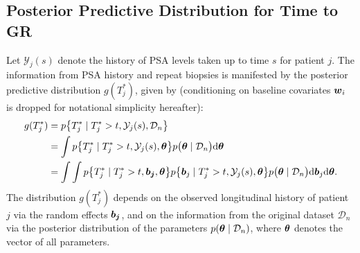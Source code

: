 
\subsection{Posterior Predictive Distribution for Time to GR}
\label{subsec : ppd_time_to_GR}
Let $\mathcal{Y}_j(s)$ denote the history of PSA levels taken up to time $s$ for patient $j$. The information from PSA history and repeat biopsies is manifested by the posterior predictive distribution $g(T^*_j)$, given by (conditioning on baseline covariates $\boldsymbol{w}_i$ is dropped for notational simplicity hereafter):
\begin{equation}
\label{eq : dyn_dist_fail_time}
\begin{split}
g(T^*_j) &= p\big\{T^*_j \mid T^*_j > t, \mathcal{Y}_j(s), \mathcal{D}_n\big\}\\
&= \int p\big\{T^*_j \mid T^*_j > t, \mathcal{Y}_j(s), \bmath{\theta}\big\}p\big(\bmath{\theta} \mid \mathcal{D}_n\big) \rmn{d} \bmath{\theta}\\
&= \int \int p\big\{T^*_j \mid T^*_j > t, \bmath{b_j}, \bmath{\theta}\big\}p\big\{\bmath{b}_j \mid T^*_j>t, \mathcal{Y}_j(s), \bmath{\theta}\big\}p\big(\bmath{\theta} \mid \mathcal{D}_n\big) \rmn{d} \bmath{b}_j \rmn{d} \bmath{\theta}.
\end{split}
\end{equation}
The distribution $g(T^*_j)$ depends on the observed longitudinal history of patient $j$ via the random effects $\boldsymbol{b_j}$, and on the information from the original dataset $\mathcal{D}_n$ via the posterior distribution of the parameters $p(\boldsymbol{\theta} \mid \mathcal{D}_n)$, where $\boldsymbol{\theta}$ denotes the vector of all parameters.